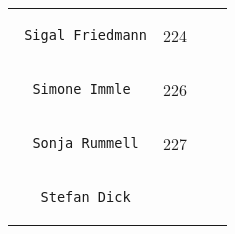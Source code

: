 \documentclass[]{article}
\begin{document}
\begin{longtable}[c]{@{}llll@{}}
\begin{minipage}[t]{0.39\columnwidth}
\begin{verbatim}
 Sigal Friedmann
\end{verbatim}
\end{minipage} & \begin{minipage}[t]{0.10\columnwidth}\raggedright
224
\end{minipage} & \begin{minipage}[t]{0.13\columnwidth}\raggedright
\end{minipage} & \begin{minipage}[t]{0.15\columnwidth}\raggedright
\end{minipage}
\\\noalign{\medskip}
\begin{minipage}[t]{0.39\columnwidth}\raggedright
\begin{verbatim}
  Simone Immle
\end{verbatim}
\end{minipage} & \begin{minipage}[t]{0.10\columnwidth}\raggedright
226
\end{minipage} & \begin{minipage}[t]{0.13\columnwidth}\raggedright
\end{minipage} & \begin{minipage}[t]{0.15\columnwidth}\raggedright
\end{minipage}
\\\noalign{\medskip}
\begin{minipage}[t]{0.39\columnwidth}\raggedright
\begin{verbatim}
  Sonja Rummell
\end{verbatim}
\end{minipage} & \begin{minipage}[t]{0.10\columnwidth}\raggedright
227
\end{minipage} & \begin{minipage}[t]{0.13\columnwidth}\raggedright
\end{minipage} & \begin{minipage}[t]{0.15\columnwidth}\raggedright
\end{minipage}
\\\noalign{\medskip}
\begin{minipage}[t]{0.39\columnwidth}\raggedright
\begin{verbatim}
   Stefan Dick
\end{verbatim}
\end{minipage} & \begin{minipage}[t]{0.10\columnwidth}\raggedright

\end{minipage}
\end{longtable}
\end{document}
